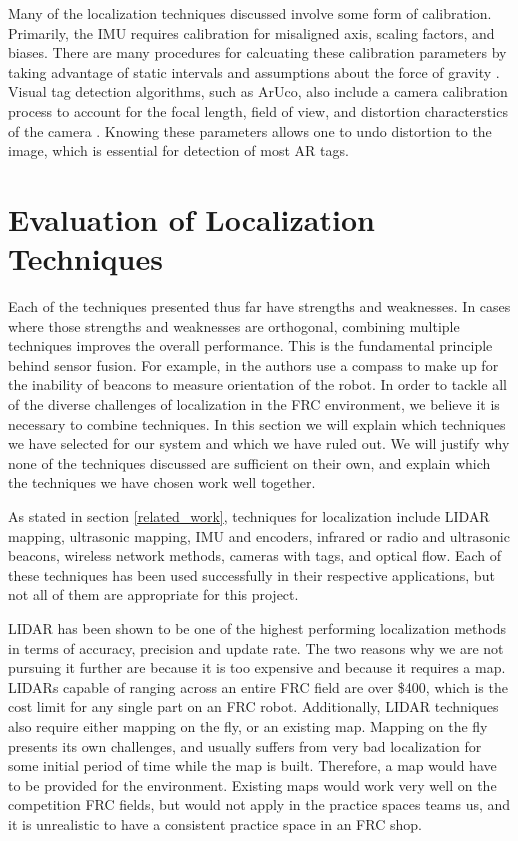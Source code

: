 \documentclass{article}
\begin{document}
  Many of the localization techniques discussed involve some form of calibration. Primarily, the IMU requires calibration for misaligned axis, scaling factors, and biases. There are many procedures for calcuating these calibration parameters by taking advantage of static intervals and assumptions about the force of gravity \cite{lupton_visual-inertial-aided_2012}\cite{lee_test_2011}\cite{tedaldi_robust_2014}. Visual tag detection algorithms, such as ArUco, also include a camera calibration process to account for the focal length, field of view, and distortion characterstics of the camera \cite{noauthor_opencv:_2017}. Knowing these parameters allows one to undo distortion to the image, which is essential for detection of most AR tags.

\section{Evaluation of Localization Techniques} \label{methods}

  Each of the techniques presented thus far have strengths and weaknesses. In cases where those strengths and weaknesses are orthogonal, combining multiple techniques improves the overall performance. This is the fundamental principle behind sensor fusion. For example, in \cite{kim_advanced_2008} the authors use a compass to make up for the inability of beacons to measure orientation of the robot. In order to tackle all of the diverse challenges of localization in the FRC environment, we believe it is necessary to combine techniques. In this section we will explain which techniques we have selected for our system and which we have ruled out. We will justify why none of the techniques discussed are sufficient on their own, and explain which the techniques we have chosen work well together.

  As stated in section \ref{related_work}, techniques for localization include LIDAR mapping, ultrasonic mapping, IMU and encoders, infrared or radio and ultrasonic beacons, wireless network methods, cameras with tags, and optical flow. Each of these techniques has been used successfully in their respective applications, but not all of them are appropriate for this project.

  LIDAR has been shown to be one of the highest performing localization methods in terms of accuracy, precision and update rate. The two reasons why we are not pursuing it further are because it is too expensive and because it requires a map. LIDARs capable of ranging across an entire FRC field are over \$400, which is the cost limit for any single part on an FRC robot. Additionally, LIDAR techniques also require either mapping on the fly, or an existing map. Mapping on the fly presents its own challenges, and usually suffers from very bad localization for some initial period of time while the map is built. Therefore, a map would have to be provided for the environment. Existing maps would work very well on the competition FRC fields, but would not apply in the practice spaces teams us, and it is unrealistic to have a consistent practice space in an FRC shop.
\end{document}
